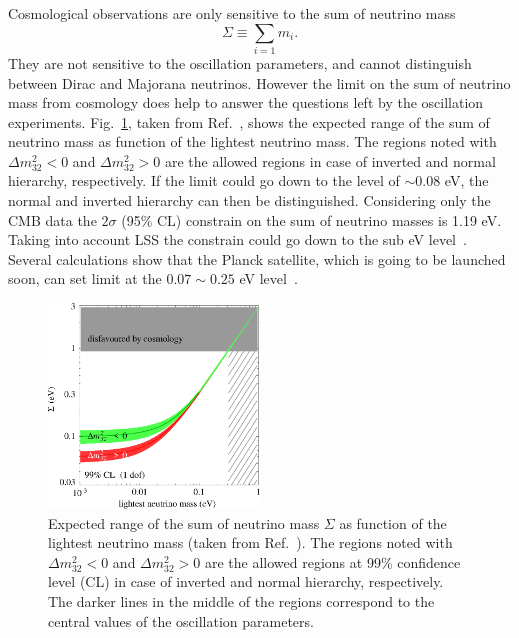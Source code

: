 Cosmological observations are only sensitive to the sum of neutrino mass
\begin{equation}
  \label{eq:msum}
  \Sigma \equiv \sum_{i=1}m_{i}.
\end{equation}
They are not sensitive to the oscillation parameters, and cannot distinguish between Dirac and Majorana neutrinos. However the limit on the sum of neutrino mass from cosmology does help to answer the questions left by the oscillation experiments. Fig.~\ref{fig:sumVSlightest}, taken from Ref.~\cite{Str05}, shows the expected range of the sum of neutrino mass as function of the lightest neutrino mass. The regions noted with $\Delta m^{2}_{32}<0$ and $\Delta m^{2}_{32}>0$ are the allowed regions in case of inverted and normal hierarchy, respectively. If the limit could go down to the level of $\sim 0.08$ eV, the normal and inverted hierarchy can then be distinguished. Considering only the CMB data the $2\sigma$ (95\% CL) constrain on the sum of neutrino masses is 1.19 eV. Taking into account LSS the constrain could go down to the sub eV level~\cite{Fog08}. Several calculations show that the Planck satellite, which is going to be launched soon, can set limit at the $0.07 \sim 0.25$ eV level~\cite{Pla05}.
\begin{figure}[tbhp]
  \centering
  \includegraphics[width=0.5\textwidth]{sumVSlightest.eps}  
  \caption{Expected range of the sum of neutrino mass $\Sigma$ as     function of the lightest neutrino mass (taken from     Ref.~\cite{Str05}).  The regions noted with $\Delta m^{2}_{32}<0$     and $\Delta m^{2}_{32}>0$ are the allowed regions at 99\%     confidence level (CL) in case of inverted and normal hierarchy,     respectively. The darker lines in the middle of the regions     correspond to the central values of the oscillation parameters.}
  \label{fig:sumVSlightest}
\end{figure}


